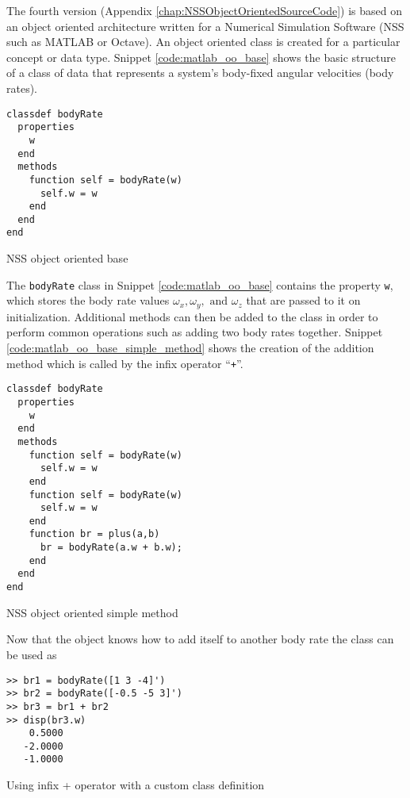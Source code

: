 The fourth version (Appendix \ref{chap:NSSObjectOrientedSourceCode}) is based on an object oriented architecture written for a Numerical Simulation Software (NSS such as MATLAB or Octave).  An object oriented class is created for a particular concept or data type.  Snippet \ref{code:matlab_oo_base} shows the basic structure of a class of data that represents a system's body-fixed angular velocities (body rates).
\begin{listing}[H]
\begin{singlespace}
  \begin{verbatim}
classdef bodyRate
  properties
    w
  end
  methods
    function self = bodyRate(w)
      self.w = w
    end
  end
end
  \end{verbatim}
\caption{NSS object oriented base}
\label{code:matlab_oo_base}
\nocite{minted}
\end{singlespace}
\end{listing}
The \verb|bodyRate| class in Snippet \ref{code:matlab_oo_base} contains the property \verb|w|, which stores the body rate values $\omega_x, \omega_y, \text{ and } \omega_z$ that are passed to it on initialization.  Additional methods can then be added to the class in order to perform common operations such as adding two body rates together.  Snippet \ref{code:matlab_oo_base_simple_method} shows the creation of the addition method which is called by the infix operator ``\verb|+|''.
\begin{listing}[H]
\begin{singlespace}
  \begin{verbatim}
classdef bodyRate
  properties
    w
  end
  methods
    function self = bodyRate(w)
      self.w = w
    end
    function self = bodyRate(w)
      self.w = w
    end
    function br = plus(a,b)
      br = bodyRate(a.w + b.w);
    end
  end
end
  \end{verbatim}
\caption{NSS object oriented simple method}
\label{code:matlab_oo_base_simple_method}
\nocite{minted}
\end{singlespace}
\end{listing}
Now that the object knows how to add itself to another body rate the class can be used as
\begin{listing}[H]
\begin{singlespace}
  \begin{verbatim}
>> br1 = bodyRate([1 3 -4]')
>> br2 = bodyRate([-0.5 -5 3]')
>> br3 = br1 + br2
>> disp(br3.w)
    0.5000
   -2.0000
   -1.0000
  \end{verbatim}
\caption{Using infix + operator with a custom class definition}
\label{code:add_body_rates}
\nocite{minted}
\end{singlespace}
\end{listing}

